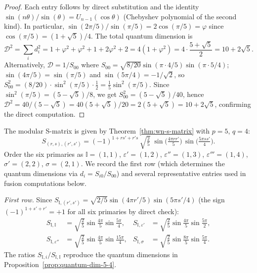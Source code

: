 \begin{proof}
Each entry follows by direct substitution and the identity
$\sin(n\theta)/\sin(\theta) = U_{n-1}(\cos\theta)$ (Chebyshev polynomial of the
second kind). In particular, $\sin(2\pi/5)/\sin(\pi/5) = 2\cos(\pi/5) = \varphi$
since $\cos(\pi/5) = (1+\sqrt{5})/4$. The total quantum dimension is
\begin{equation}
\mathcal{D}^2 = \sum_i d_i^2 = 1 + \varphi^2 + \varphi^2 + 1 + 2\varphi^2 + 2
= 4(1 + \varphi^2) = 4\cdot\frac{5+\sqrt{5}}{2} = 10 + 2\sqrt{5}.
\end{equation}
Alternatively, $\mathcal{D} = 1/S_{00}$ where
$S_{00} = \sqrt{8/20}\sin(\pi\cdot 4/5)\sin(\pi\cdot 5/4)$;
$\sin(4\pi/5) = \sin(\pi/5)$ and $\sin(5\pi/4) = -1/\sqrt{2}$,
so $S_{00}^2 = (8/20) \cdot \sin^2(\pi/5) \cdot \tfrac{1}{2}
= \tfrac{1}{5}\sin^2(\pi/5)$.
Since $\sin^2(\pi/5) = (5-\sqrt{5})/8$,
we get $S_{00}^2 = (5-\sqrt{5})/40$, hence
$\mathcal{D}^2 = 40/(5-\sqrt{5}) = 40(5+\sqrt{5})/20 = 2(5+\sqrt{5}) = 10 + 2\sqrt{5}$,
confirming the direct computation.
\end{proof}

\begin{computation}\label{comp:s-matrix-5-4}
The modular S-matrix is given by Theorem~\ref{thm:wn-s-matrix} with $p=5$, $q=4$:
\begin{equation}\label{eq:s-matrix-5-4-formula}
S_{(r,s),(r',s')} = (-1)^{1+rs'+r's}\,\sqrt{\tfrac{2}{5}}\;
\sin\!\bigl(\tfrac{4\pi r r'}{5}\bigr)\,
\sin\!\bigl(\tfrac{5\pi s s'}{4}\bigr).
\end{equation}
Order the six primaries as $\mathbb{I}=(1,1)$, $\varepsilon'=(1,2)$,
$\varepsilon''=(1,3)$, $\varepsilon'''=(1,4)$, $\sigma'=(2,2)$, $\sigma=(2,1)$.
We record the first row (which determines the quantum dimensions via $d_i = S_{i0}/S_{00}$)
and several representative entries used in fusion computations below.

\emph{First row.} Since $S_{\mathbb{I},(r',s')} = \sqrt{2/5}\sin(4\pi r'/5)\sin(5\pi s'/4)$
(the sign $(-1)^{1+s'+r'} = +1$ for all six primaries by direct check):
\begin{align}
S_{\mathbb{I},\mathbb{I}} &= \sqrt{\tfrac{2}{5}}\sin\tfrac{4\pi}{5}\sin\tfrac{5\pi}{4}, &
S_{\mathbb{I},\varepsilon'} &= \sqrt{\tfrac{2}{5}}\sin\tfrac{4\pi}{5}\sin\tfrac{5\pi}{2}, \\
S_{\mathbb{I},\varepsilon''} &= \sqrt{\tfrac{2}{5}}\sin\tfrac{4\pi}{5}\sin\tfrac{15\pi}{4}, &
S_{\mathbb{I},\sigma} &= \sqrt{\tfrac{2}{5}}\sin\tfrac{8\pi}{5}\sin\tfrac{5\pi}{4}.
\end{align}
The ratios $S_{\mathbb{I},i}/S_{\mathbb{I},\mathbb{I}}$ reproduce the quantum dimensions in
Proposition~\ref{prop:quantum-dim-5-4}.
\end{computation}

